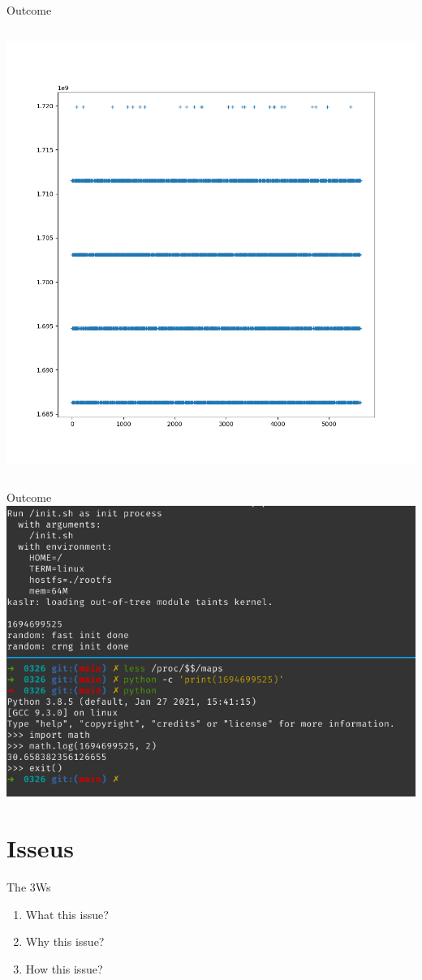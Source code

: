 \documentclass{beamer}
\begin{document}
\begin{frame}{Outcome}
\begin{columns}
\begin{column}{.5\textwidth}
            \includegraphics[width=\textwidth]{kaslr.png}
        \end{column}
    \end{columns}
\end{frame}

\begin{frame}{Outcome}
    \centering\includegraphics[width=.9\textwidth]{k32_1G.png}
\end{frame}

\section{Isseus}
\begin{frame}{The 3Ws}
    \begin{enumerate}
        \item What this issue?
        \item Why this issue?
        \item How this issue?
    \end{enumerate}
\end{frame}
\end{document}
